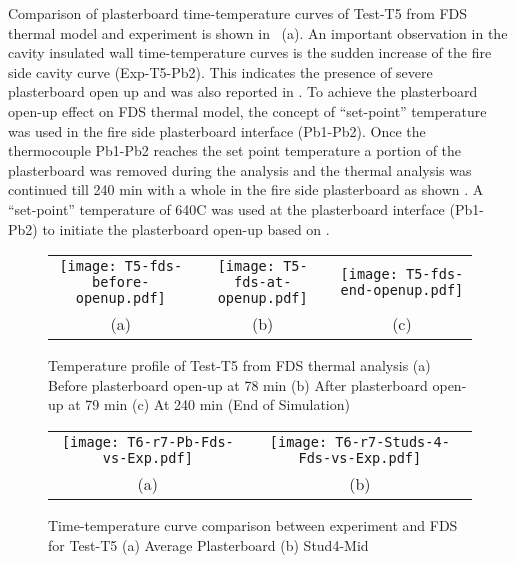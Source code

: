 Comparison of plasterboard time-temperature curves of Test-T5 from FDS thermal model and experiment is shown in ~(a). An important observation in the cavity insulated wall time-temperature curves is the sudden increase of the fire side cavity curve (Exp-T5-Pb2). This indicates the presence of severe plasterboard open up and was also reported in . To achieve the plasterboard open-up effect on FDS thermal model, the concept of ``set-point'' temperature was used in the fire side plasterboard interface (Pb1-Pb2). Once the thermocouple Pb1-Pb2 reaches the set point temperature a portion of the plasterboard was removed during the analysis and the thermal analysis was continued till 240 min with a whole in the fire side plasterboard as shown . A ``set-point'' temperature of 640\degree C was used at the plasterboard interface (Pb1-Pb2) to initiate the plasterboard open-up based on \citet{Sultan2015}. 
\begin{figure}[!htbp]
	\begin{center}
		\begin{tabular}{ccc}
			\texttt{[image: T5-fds-before-openup.pdf]} &
			\texttt{[image: T5-fds-at-openup.pdf]} &
			\texttt{[image: T5-fds-end-openup.pdf]}\\
			(a) & (b)& (c)\\
		\end{tabular} 
		\caption{Temperature profile of Test-T5 from FDS thermal analysis (a) Before plasterboard open-up at 78 min (b) After plasterboard open-up at 79 min (c) At 240 min (End of Simulation)}
		\label{fig:T5-fds-output}
	\end{center}
\end{figure}
\begin{figure}[!htbp]
	\centering
		\begin{tabular}{cc}
			\texttt{[image: T6-r7-Pb-Fds-vs-Exp.pdf]} & \texttt{[image: T6-r7-Studs-4-Fds-vs-Exp.pdf]} \\
			(a) & (b) \\
		\end{tabular} 
		\caption{Time-temperature curve comparison between experiment and FDS for Test-T5 (a) Average Plasterboard (b) Stud4-Mid}
		\label{fig:fds-output-pb-studs-t6}
\end{figure}

